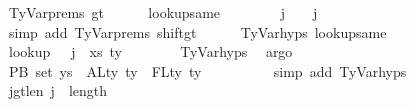 \begin{isabellebody}
\ TyVar{\isachardot}{\kern0pt}prems{\isacharparenleft}{\kern0pt}{}{\isacharparenright}{\kern0pt}\ gt\isanewline
\ \ \ \ \isamarkupfalse%
\ lookup{\isacharunderscore}{\kern0pt}same{\isacharcolon}{\kern0pt}\isanewline
\ \ \ \ \ \ {\isachardoublequoteopen}{\isasymGamma}\ {\isacharbang}{\kern0pt}\ j\ {\isacharequal}{\kern0pt}\ {\isasymGamma}{}\ {\isacharbang}{\kern0pt}\ j{\isachardoublequoteclose}\isanewline
\ \ \ \ \ \ \isamarkupfalse%
\ {\isacharparenleft}{\kern0pt}simp\ add{\isacharcolon}{\kern0pt}\ TyVar{\isachardot}{\kern0pt}prems{\isacharparenleft}{\kern0pt}{}{\isacharcomma}{\kern0pt}{}{\isacharparenright}{\kern0pt}\ shift{\isacharunderscore}{\kern0pt}gt{\isacharparenright}{\kern0pt}\isanewline
\isanewline
\ \ \ \ \isamarkupfalse%
\ TyVar{\isachardot}{\kern0pt}hyps{\isacharparenleft}{\kern0pt}{}{\isacharparenright}{\kern0pt}\ lookup{\isacharunderscore}{\kern0pt}same\isanewline
\ \ \ \ \isamarkupfalse%
\ lookup{}{\isacharcolon}{\kern0pt}\ {\isachardoublequoteopen}{\isasymGamma}{}\ {\isacharbang}{\kern0pt}\ j\ {\isacharequal}{\kern0pt}\ {\isacharparenleft}{\kern0pt}xs{\isacharprime}{\kern0pt}{\isacharcomma}{\kern0pt}\ ty{\isacharprime}{\kern0pt}{\isacharparenright}{\kern0pt}{\isachardoublequoteclose}\isanewline
\ \ \ \ \ \ \isamarkupfalse%
\ TyVar{\isachardot}{\kern0pt}hyps{\isacharparenleft}{\kern0pt}{}{\isacharparenright}{\kern0pt}\ \isamarkupfalse%
\ argo\isanewline
\isanewline
\ \ \ \ \isamarkupfalse%
\ P{}B{\isacharcolon}{\kern0pt}\ {\isachardoublequoteopen}set\ ys\ {\isasyminter}\ ALty\ ty{\isacharprime}{\kern0pt}\ {\isacharminus}{\kern0pt}\ FLty\ ty{\isacharprime}{\kern0pt}\ {\isacharequal}{\kern0pt}\ {\isacharbraceleft}{\kern0pt}{\isacharbraceright}{\kern0pt}{\isachardoublequoteclose}\isanewline
\ \ \ \ \ \ \isamarkupfalse%
\ {\isacharparenleft}{\kern0pt}simp\ add{\isacharcolon}{\kern0pt}\ TyVar{\isachardot}{\kern0pt}hyps{\isacharparenleft}{\kern0pt}{}{\isacharparenright}{\kern0pt}{\isacharparenright}{\kern0pt}\isanewline
\isanewline
\isanewline
\ \ \ \ \isamarkupfalse%
\ j{\isacharunderscore}{\kern0pt}gt{\isacharunderscore}{\kern0pt}len{\isacharunderscore}{\kern0pt}{\isasymGamma}{}{\isacharcolon}{\kern0pt}\ {\isachardoublequoteopen}j\ {\isacharless}{\kern0pt}\ length\ {\isasymGamma}{}{\isachardoublequoteclose}\isanewline
\ \ \ \ \isamarkupfalse%

\end{isabellebody}
